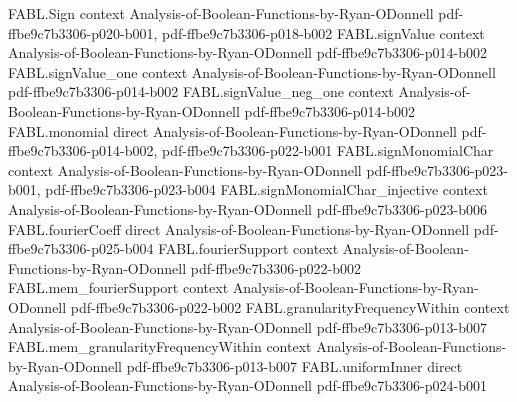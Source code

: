 \begin{theorem}
\label{FABL.FiniteFourierBasis.productDegree_eq_spectralDegree}
\leanok
{}
\proofstep
  {FABL.Sign}
  {context}
  {Analysis-of-Boolean-Functions-by-Ryan-ODonnell}
  {pdf-ffbe9c7b3306-p020-b001,
    pdf-ffbe9c7b3306-p018-b002}
\proofstep
  {FABL.signValue}
  {context}
  {Analysis-of-Boolean-Functions-by-Ryan-ODonnell}
  {pdf-ffbe9c7b3306-p014-b002}
\proofstep
  {FABL.signValue_one}
  {context}
  {Analysis-of-Boolean-Functions-by-Ryan-ODonnell}
  {pdf-ffbe9c7b3306-p014-b002}
\proofstep
  {FABL.signValue_neg_one}
  {context}
  {Analysis-of-Boolean-Functions-by-Ryan-ODonnell}
  {pdf-ffbe9c7b3306-p014-b002}
\proofstep
  {FABL.monomial}
  {direct}
  {Analysis-of-Boolean-Functions-by-Ryan-ODonnell}
  {pdf-ffbe9c7b3306-p014-b002,
    pdf-ffbe9c7b3306-p022-b001}
\proofstep
  {FABL.signMonomialChar}
  {context}
  {Analysis-of-Boolean-Functions-by-Ryan-ODonnell}
  {pdf-ffbe9c7b3306-p023-b001,
    pdf-ffbe9c7b3306-p023-b004}
\proofstep
  {FABL.signMonomialChar_injective}
  {context}
  {Analysis-of-Boolean-Functions-by-Ryan-ODonnell}
  {pdf-ffbe9c7b3306-p023-b006}
\proofstep
  {FABL.fourierCoeff}
  {direct}
  {Analysis-of-Boolean-Functions-by-Ryan-ODonnell}
  {pdf-ffbe9c7b3306-p025-b004}
\proofstep
  {FABL.fourierSupport}
  {context}
  {Analysis-of-Boolean-Functions-by-Ryan-ODonnell}
  {pdf-ffbe9c7b3306-p022-b002}
\proofstep
  {FABL.mem_fourierSupport}
  {context}
  {Analysis-of-Boolean-Functions-by-Ryan-ODonnell}
  {pdf-ffbe9c7b3306-p022-b002}
\proofstep
  {FABL.granularityFrequencyWithin}
  {context}
  {Analysis-of-Boolean-Functions-by-Ryan-ODonnell}
  {pdf-ffbe9c7b3306-p013-b007}
\proofstep
  {FABL.mem_granularityFrequencyWithin}
  {context}
  {Analysis-of-Boolean-Functions-by-Ryan-ODonnell}
  {pdf-ffbe9c7b3306-p013-b007}
\proofstep
  {FABL.uniformInner}
  {direct}
  {Analysis-of-Boolean-Functions-by-Ryan-ODonnell}
  {pdf-ffbe9c7b3306-p024-b001}
\proofstep

\end{theorem}
